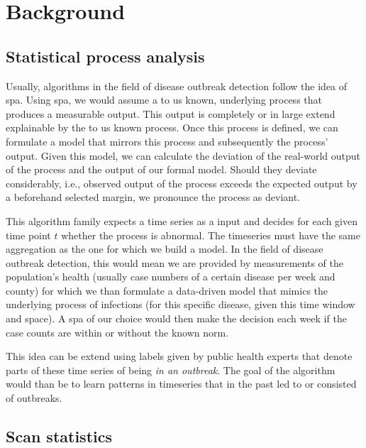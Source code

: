\documentclass[a4paper, 12pt, one column]{article}
\begin{document}
\section{Background}

\subsection{Statistical process analysis}

Usually, algorithms in the field of disease outbreak detection follow the idea of \ac{spa}. Using \ac{spa}, we would assume a to us known, underlying process that produces a measurable output. This output is completely or in large extend explainable by the to us known process. Once this process is defined, we can formulate a model that mirrors this process and subsequently the process' output. Given this model, we can calculate the deviation of the real-world output of the process and the output of our formal model. Should they deviate considerably, i.e., observed output of the process exceeds the expected output by a beforehand selected margin, we pronounce the process as deviant.

This algorithm family expects a time series as a input and decides for each given time point \(t\) whether the process is abnormal. The timeseries must have the same aggregation as the one for which we build a model. In the field of disease outbreak detection, this would mean we are provided by measurements of the population's health (usually case numbers of a certain disease per week and county) for which we than formulate a data-driven model that mimics the underlying process of infections (for this specific disease, given this time window and space). A \ac{spa} of our choice would then make the decision each week if the case counts are within or without the known norm. 

This idea can be extend using labels given by public health experts that denote parts of these time series of being \emph{in an outbreak}. The goal of the algorithm would than be to learn patterns in timeseries that in the past led to or consisted of outbreaks.

\subsection{Scan statistics}
\end{document}
